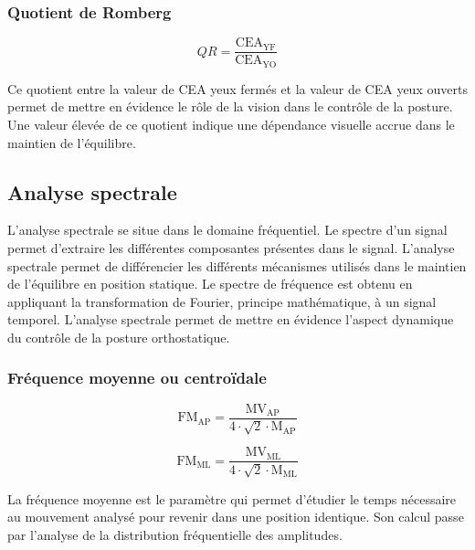 \subsubsection{Quotient de Romberg}

\begin{equation}
  QR = \frac{\text{CEA}_{\text{YF}}}{\text{CEA}_{\text{YO}}}
  \label{eq:QR}
\end{equation}

Ce quotient entre la valeur de CEA yeux fermés et la valeur de CEA yeux ouverts permet de mettre en évidence le rôle de la vision dans le contrôle de la posture. 
Une valeur élevée de ce quotient indique une dépendance visuelle accrue dans le maintien de l'équilibre.

\subsection{Analyse spectrale}

L'analyse spectrale se situe dans le domaine fréquentiel.
Le spectre d'un signal permet d'extraire les différentes composantes présentes dans le signal. 
L'analyse spectrale permet de différencier les différents mécanismes utilisés dans le maintien de l'équilibre en position statique.
Le spectre de fréquence est obtenu en appliquant la transformation de Fourier, principe mathématique, à un signal temporel. 
L'analyse spectrale permet de mettre en évidence l'aspect dynamique du contrôle de la posture orthostatique.

\subsubsection{Fréquence moyenne ou centroïdale}

\begin{equation}
  \text{FM}_{\text{AP}} = \frac{\text{MV}_{\text{AP}}}{4\cdot\sqrt{2}\cdot\text{M}_{\text{AP}}}
  \label{eq:FM_AP}
\end{equation}

\begin{equation}
  \text{FM}_{\text{ML}} = \frac{\text{MV}_{\text{ML}}}{4 \cdot \sqrt{2} \cdot \text{M}_{\text{ML}}}
  \label{eq:FM_ML}
\end{equation}

La fréquence moyenne est le paramètre qui permet d'étudier le temps nécessaire au mouvement analysé pour revenir dans une position identique. 
Son calcul passe par l'analyse de la distribution fréquentielle des amplitudes.

